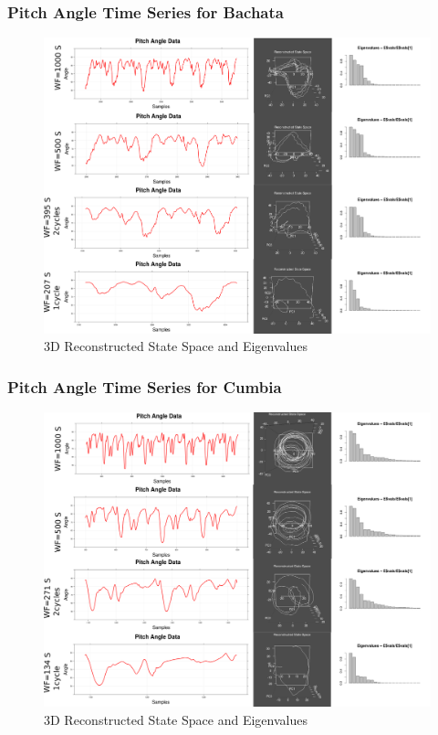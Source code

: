 \documentclass{beamer}
\theoremstyle{definition}
\begin{document}
\begin{frame}
\frametitle{Pitch Angle Time Series for Bachata}

\begin{figure}
\includegraphics[scale=0.129]{bachata}
\caption{3D Reconstructed State Space and Eigenvalues}
\end{figure}  
\end{frame}


\begin{frame}
\frametitle{Pitch Angle Time Series for Cumbia}

\begin{figure}
\includegraphics[scale=0.129]{cumbia}
\caption{3D Reconstructed State Space and Eigenvalues}
\end{figure}  
\end{frame}
\end{document}
